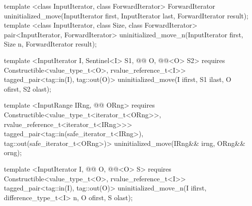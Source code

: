 {\color{remclr}
\begin{codeblock}
template <class InputIterator, class ForwardIterator>
  ForwardIterator uninitialized_move(InputIterator first, InputIterator last,
                                     ForwardIterator result);
template <class InputIterator, class Size, class ForwardIterator>
  pair<InputIterator, ForwardIterator>
    uninitialized_move_n(InputIterator first, Size n, ForwardIterator result);
\end{codeblock}
} %
{\color{addclr}
\begin{codeblock}
template <InputIterator I, Sentinel<I> S1, @@ O, @@<O> S2>
requires
  Constructible<value_type_t<O>, rvalue_reference_t<I>>
tagged_pair<tag::in(I), tag::out(O)>
  uninitialized_move(I ifirst, S1 ilast, O ofirst, S2 olast);

template <InputRange IRng, @@ ORng>
  requires
Constructible<value_type_t<iterator_t<ORng>>, rvalue_reference_t<iterator_t<IRng>>>
  tagged_pair<tag::in(safe_iterator_t<IRng>), tag::out(safe_iterator_t<ORng>)>
uninitialized_move(IRng&& irng, ORng&& orng);

template <InputIterator I, @@ O, @@<O> S>
  requires
Constructible<value_type_t<O>, rvalue_reference_t<I>>
  tagged_pair<tag::in(I), tag::out(O)>
uninitialized_move_n(I ifirst, difference_type_t<I> n, O ofirst, S olast);
\end{codeblock}
} %

